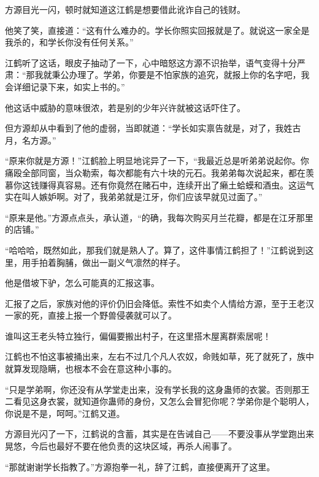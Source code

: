 \begin{this_body}
方源目光一闪，顿时就知道这江鹤是想要借此讹诈自己的钱财。

他笑了笑，直接道：“这有什么难办的。学长你照实回报就是了。就说这一家全是我杀的，和学长你没有任何关系。”

江鹤听了这话，眼皮子抽动了一下，心中暗怒这方源不识抬举，语气变得十分严肃：“那我就秉公办理了。学弟，你要是不怕家族的追究，就报上你的名字吧，我会详细记录下来，如实上书的。”

他这话中威胁的意味很浓，若是别的少年兴许就被这话吓住了。

但方源却从中看到了他的虚弱，当即就道：“学长如实禀告就是，对了，我姓古月，名方源。”

“原来你就是方源！”江鹤脸上明显地诧异了一下，“我最近总是听弟弟说起你。你痛殴全部同窗，当众勒索，每次都能有六十块的元石。我弟弟每次说起来，都在羡慕你这钱赚得真容易。还有你竟然在赌石中，连续开出了癞土蛤蟆和酒虫。这运气实在叫人嫉妒啊。对了，我弟弟就是江牙，你们应该早就见过面了。”

“原来是他。”方源点点头，承认道，“的确，我每次购买月兰花瓣，都是在江牙那里的店铺。”

“哈哈哈，既然如此，那我们就是熟人了。算了，这件事情江鹤担了！”江鹤说到这里，用手拍着胸脯，做出一副义气凛然的样子。

他是借坡下驴，怎么可能真的汇报这事。

汇报了之后，家族对他的评价仍旧会降低。索性不如卖个人情给方源，至于王老汉一家的死，直接上报一个野兽侵袭就可以了。

谁叫这王老头特立独行，偏偏要搬出村子，在这里搭木屋离群索居呢！

江鹤也不怕这事被捅出来，左右不过几个凡人农奴，命贱如草，死了就死了，族中就算发现隐瞒，也根本不会在意这种小事的。

“只是学弟啊，你还没有从学堂走出来，没有学长我的这身蛊师的衣裳。否则那王二看见这身衣裳，就知道你蛊师的身份，又怎么会冒犯你呢？学弟你是个聪明人，你说是不是，呵呵。”江鹤又道。

方源目光闪了一下，江鹤说的含蓄，其实是在告诫自己——不要没事从学堂跑出来晃悠，今后也最好不要在他负责的这块区域，再杀人闹事了。

“那就谢谢学长指教了。”方源抱拳一礼，辞了江鹤，直接便离开了这里。

\end{this_body}

